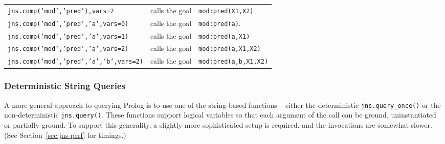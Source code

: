 \begin{example}
\begin{tabular}{lll}
  {\tt jns.comp('mod','pred'),vars=2}       & calls the goal & {\tt mod:pred(X1,X2)} \\
  {\tt jns.comp('mod','pred','a',vars=0)}   & calls the goal & {\tt mod:pred(a)}. \\
  {\tt jns.comp('mod','pred','a',vars=1)}   & calls the goal & {\tt mod:pred(a,X1)} \\
  {\tt jns.comp('mod','pred','a',vars=2)}   & calls the goal & {\tt mod:pred(a,X1,X2)} \\
  {\tt jns.comp('mod','pred','a','b',vars=2)} & calls the goal & {\tt mod:pred(a,b,X1,X2)} \\
\end{tabular}
\end{example}


\subsubsection{Deterministic String Queries}

A more general approach to querying Prolog is to use one of the string-based
functions -- either the deterministic {\tt jns.query\_once()} or the
non-deterministic {\tt jns.query()}.  These functions support logical
variables so that each argument of the call can be ground,
uninstantiated or partially ground.  To support this generality, a
slightly more sophisticated setup is required, and the invocations are
somewhat slower. (See Section~\ref{sec:jns-perf} for timings.)

